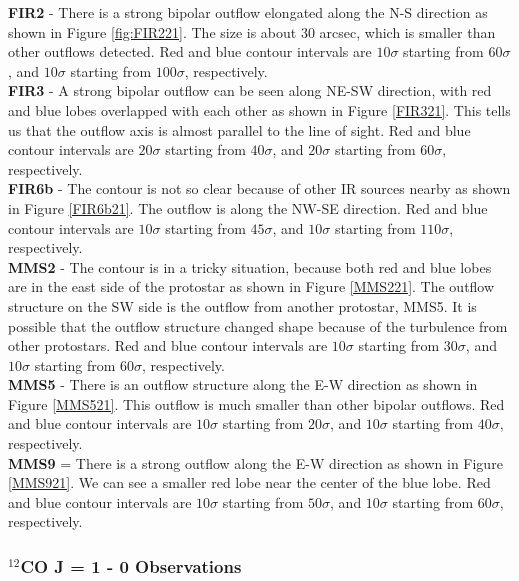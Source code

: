 \noindent\textbf{FIR2} - There is a strong bipolar outflow elongated along the N-S direction as shown in Figure \ref{fig:FIR221}. The size is about 30 arcsec, which is smaller than other outflows detected. Red and blue contour intervals are $10\sigma$ starting from $60\sigma$, and $10\sigma$ starting from $100\sigma$, respectively.\\
\textbf{FIR3} - A strong bipolar outflow can be seen along NE-SW direction, with red and blue lobes overlapped with each other as shown in Figure \ref{FIR321}. This tells us that the outflow axis is almost parallel to the line of sight. Red and blue contour intervals are $20\sigma$ starting from $40\sigma$, and $20\sigma$ starting from $60\sigma$, respectively. \\
\textbf{FIR6b} - The contour is not so clear because of other IR sources nearby as shown in Figure \ref{FIR6b21}. The outflow is along the NW-SE direction. Red and blue contour intervals are $10\sigma$ starting from $45\sigma$, and $10\sigma$ starting from $110\sigma$, respectively.\\
\textbf{MMS2} - The contour is in a tricky situation, because both red and blue lobes are in the east side of the protostar as shown in Figure \ref{MMS221}. The outflow structure on the SW side is the outflow from another protostar, MMS5. It is possible that the outflow structure changed shape because of the turbulence from other protostars. Red and blue contour intervals are $10\sigma$ starting from $30\sigma$, and $10\sigma$ starting from $60\sigma$, respectively.\\
\textbf{MMS5} - There is an outflow structure along the E-W direction as shown in Figure \ref{MMS521}. This outflow is much smaller than other bipolar outflows. Red and blue contour intervals are $10\sigma$ starting from $20\sigma$, and $10\sigma$ starting from $40\sigma$, respectively.\\
\textbf{MMS9} = There is a strong outflow along the E-W direction as shown in Figure \ref{MMS921}. We can see a smaller red lobe near the center of the blue lobe. Red and blue contour intervals are $10\sigma$ starting from $50\sigma$, and $10\sigma$ starting from $60\sigma$, respectively.\\

\subsubsection{$^{12}$CO J = 1 - 0 Observations}

